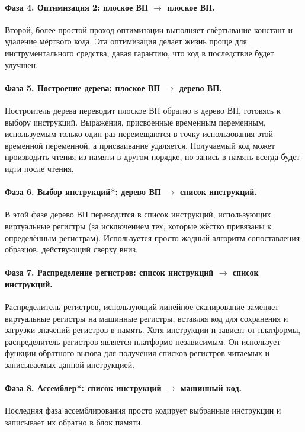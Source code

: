 \documentclass[a4paper,12pt,russian]{article}
\begin{document}
\paragraph{Фаза 4. Оптимизация 2: плоское ВП $\longrightarrow$ плоское ВП.}
Второй, более простой проход оптимизации выполняет свёртывание констант и удаление мёртвого кода. Эта оптимизация делает жизнь проще для инструментального средства, давая гарантию, что код в последствие будет улучшен.

\paragraph{Фаза 5. Построение дерева: плоское ВП $\longrightarrow$ дерево ВП.}
Построитель дерева переводит плоское ВП обратно в дерево ВП, готовясь к выбору инструкций. Выражения, присвоенные временным переменным, используемым только один раз перемещаются в точку использования этой временной переменной, а присваивание удаляется. Получаемый код может производить чтения из памяти в другом порядке, но запись в память всегда будет идти после чтения.

\paragraph{Фаза 6. Выбор инструкций*: дерево ВП $\longrightarrow$ список инструкций.}
В этой фазе дерево ВП переводится в список инструкций, использующих виртуальные регистры (за исключением тех, которые жёстко привязаны к определённым регистрам). Используется просто жадный алгоритм сопоставления образцов, действующий сверху вниз.

\paragraph{Фаза 7. Распределение регистров: список инструкций $\longrightarrow$ список инструкций.}
Распределитель регистров, использующий линейное сканирование заменяет виртуальные регистры на машинные регистры, вставляя код для сохранения и загрузки значений регистров в память.
Хотя инструкции и зависят от платформы, распределитель регистров является платформо-независимым.
Он использует функции обратного вызова для получения списков регистров читаемых и записываемых данной инструкцией.

\paragraph{Фаза 8. Ассемблер*: список инструкций $\longrightarrow$ машинный код.}
Последняя фаза ассемблирования просто кодирует выбранные инструкции и записывает их обратно в блок памяти.
\end{document}
